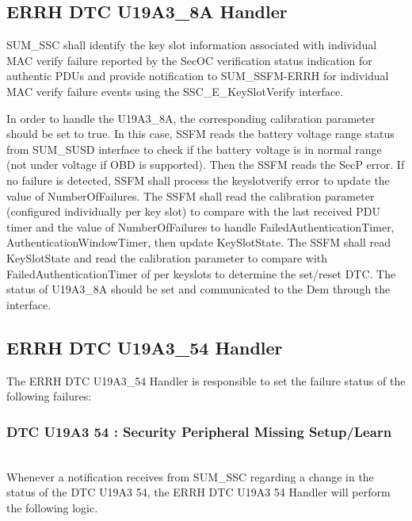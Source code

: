 {       }

\subsection{ERRH DTC U19A3_8A Handler}
\label{subsection:ERRHDTCU19A38AHandler}
SUM_SSC shall identify the key slot information associated with individual MAC verify failure reported by the SecOC verification status indication for authentic PDUs and provide notification to SUM_SSFM-ERRH for individual MAC verify failure events using the SSC_E_KeySlotVerify interface.

In order to handle the U19A3_8A, the corresponding calibration parameter  should be set to true.
In this case, SSFM reads the battery voltage range status from SUM_SUSD  interface to check if the battery voltage is in normal range (not under voltage if OBD is supported).
Then the SSFM reads the SecP error. If no failure is detected, SSFM shall process the keyslotverify error to update the value of NumberOfFailures.
The SSFM shall read the calibration parameter  (configured individually per key slot) to compare with the last received PDU timer and the value of NumberOfFailures to handle FailedAuthenticationTimer, AuthenticationWindowTimer, then update KeySlotState.
The SSFM shall read KeySlotState and read the calibration parameter  to compare with FailedAuthenticationTimer of per keyslots to determine the set/reset DTC.
The status of U19A3_8A should be set and communicated to the Dem through the  interface.
 

{         }

\subsection{ERRH DTC U19A3_54 Handler}
The ERRH DTC U19A3_54 Handler is responsible to set the failure status of the following failures:

\subsubsection{DTC U19A3 54 : Security Peripheral Missing Setup/Learn}
\\
Whenever a notification receives from SUM_SSC regarding a change in the status of the DTC U19A3 54, the ERRH DTC U19A3 54 Handler will perform the following logic.

